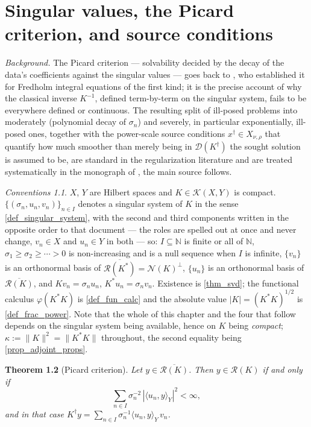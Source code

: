 \documentclass[a4paper]{report}
\theoremstyle{plain}
\newtheorem{theorem}{Theorem}[chapter]
\theoremstyle{definition}
\theoremstyle{remark}
\newtheorem{assumptions}[theorem]{Conventions}
\newcommand{\Kk}{\mathcal{K}}
\newcommand{\Ran}{\mathcal{R}}
\newcommand{\Ker}{\mathcal{N}}
\newcommand{\Dom}{\mathcal{D}}
\newcommand{\dg}{^{\dagger}}
\begin{document}
\chapter{Singular values, the Picard criterion, and source conditions}
\label{ch_12_picard}

\noindent\emph{Background.} The Picard criterion --- solvability decided by the decay of
the data's coefficients against the singular values --- goes back to \citet{Picard1910},
who established it for Fredholm integral equations of the first kind; it is the precise
account of why the classical inverse $K^{-1}$, defined term-by-term on the singular
system, fails to be everywhere defined or continuous. The resulting split of ill-posed
problems into moderately (polynomial decay of $\sigma_n$) and severely, in particular
exponentially, ill-posed ones, together with the power-scale source conditions
$x\dg \in X_{\nu,\rho}$ that quantify how much smoother than merely being in
$\Dom(K\dg)$ the sought solution is assumed to be, are standard in the regularization
literature and are treated systematically in the monograph of
\citet{EnglHankeNeubauer1996}, the main source \citet{Clason2021} follows.

\begin{assumptions}
  \label{asm_singular_values_picard}
  $X$, $Y$ are Hilbert spaces and $K \in \Kk(X,Y)$ is
compact.  $\{(\sigma_n, u_n, v_n)\}_{n \in I}$ denotes a singular system of $K$ in the
sense \cref{def_singular_system}, with the second and
third components written in the opposite order to that document --- the roles are spelled
out at once and never change, $v_n \in X$ and $u_n \in Y$ in both --- so: $I \subseteq
\mathbb{N}$ is finite or all of $\mathbb{N}$, $\sigma_1 \ge \sigma_2 \ge \cdots > 0$ is
non-increasing and is a null sequence when $I$ is infinite, $\{v_n\}$ is an orthonormal
basis of $\overline{\Ran(K^{*})} = \Ker(K)^{\perp}$, $\{u_n\}$ is an orthonormal basis of
$\overline{\Ran(K)}$, and $Kv_n = \sigma_n u_n$, $K^{*}u_n = \sigma_n v_n$.  Existence is
\cref{thm_svd}; the functional calculus $\varphi(K^{*}K)$ is \cref{def_fun_calc} and the
absolute value $|K| = (K^{*}K)^{1/2}$ is \cref{def_frac_power}.  Note that the whole of this
chapter and the four that follow depends on the singular system being available, hence on
$K$ being \emph{compact}; $\kappa := \|K\|^{2} = \|K^{*}K\|$ throughout, the second
equality being \cref{prop_adjoint_props}.
\end{assumptions}

\begin{theorem}[Picard criterion]
  \label{thm_picard}
  Let $y \in \overline{\Ran(K)}$.  Then $y \in \Ran(K)$ if and only if
  \[
    \sum_{n \in I} \sigma_n^{-2}\,|\langle u_n, y\rangle_Y|^{2} < \infty ,
  \]
  and in that case $K\dg y = \sum_{n \in I} \sigma_n^{-1}\langle u_n, y\rangle_Y\, v_n$.
\end{theorem}
\end{document}
